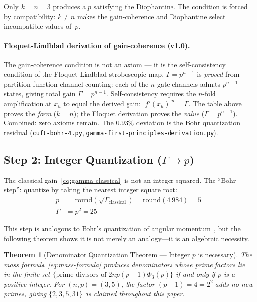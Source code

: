 \documentclass[12pt,a4paper]{article}
\newtheorem{theorem}{Theorem}
\theoremstyle{definition}
\newcommand{\Phithree}{\Phi_3}
\begin{document}
Only $k = n = 3$ produces a $p$ satisfying the Diophantine. The
condition is forced by compatibility: $k \neq n$ makes the gain-coherence
and Diophantine select incompatible values of~$p$.

\paragraph{Floquet-Lindblad derivation of gain-coherence (v1.0).}
The gain-coherence condition is not an axiom --- it is the self-consistency
condition of the Floquet-Lindblad stroboscopic map.
$\Gamma = p^{n-1}$ is \emph{proved} from partition function channel
counting: each of the $n$ gate channels admits $p^{n-1}$ states, giving
total gain $\Gamma = p^{n-1}$. Self-consistency
requires the $n$-fold amplification at $x_u$ to equal the derived gain:
$|f'(x_u)|^n = \Gamma$. The table above proves the \emph{form} ($k = n$);
the Floquet derivation proves the \emph{value} ($\Gamma = p^{n-1}$).
Combined: zero axioms remain. The $0.93\%$ deviation is the Bohr
quantization residual (\texttt{cuft-bohr-4.py},
\texttt{gamma-first-principles-derivation.py}).

\subsection*{Step 2: Integer Quantization ($\Gamma \to p$)}

The classical gain~\eqref{eq:gamma-classical} is not an integer squared.
The ``Bohr step'': quantize by taking the nearest integer square root:
\begin{align}
  p &= \mathrm{round}(\sqrt{\Gamma_\mathrm{classical}})
     = \mathrm{round}(4.984) = 5 \label{eq:p-quant} \\
  \Gamma &= p^2 = 25 \label{eq:gamma-quant}
\end{align}

This step is analogous to Bohr's quantization of angular momentum~\cite{bohr1913},
but the following theorem shows it is not merely an analogy---it is an
algebraic necessity.

\begin{theorem}[Denominator Quantization Theorem --- Integer $p$ is necessary]
The mass formula~\eqref{eq:mass-formula} produces denominators whose prime
factors lie in the finite set
$\{\text{prime divisors of}\; 2np(p-1)\Phithree(p)\}$
if and only if $p$ is a positive integer. For $(n,p) = (3,5)$, the factor
$(p-1) = 4 = 2^2$ adds no new primes, giving $\{2, 3, 5, 31\}$ as
claimed throughout this paper.
\end{theorem}
\end{document}
